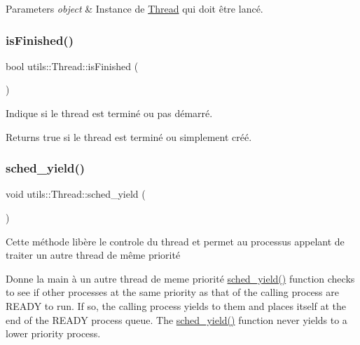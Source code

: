 \begin{DoxyParams}{Parameters}
{\em object} & Instance de \hyperlink{classutils_1_1Thread}{Thread} qui doit être lancé. \\
\hline
\end{DoxyParams}
\mbox{\label{classutils_1_1Thread_acc5214a88eab5c3bd421e7ee06f66b1a}} 
\subsubsection{\texorpdfstring{is\+Finished()}{isFinished()}}
{\footnotesize\ttfamily bool utils\+::\+Thread\+::is\+Finished (\begin{DoxyParamCaption}{ }\end{DoxyParamCaption})\hspace{0.3cm}{\ttfamily [inline]}}



Indique si le thread est terminé ou pas démarré. 

\begin{DoxyReturn}{Returns}
{\ttfamily true} si le thread est terminé ou simplement créé. 
\end{DoxyReturn}
\mbox{\label{classutils_1_1Thread_a540314edf56707d4f8732af3be6d7044}} 
\subsubsection{\texorpdfstring{sched\+\_\+yield()}{sched\_yield()}}
{\footnotesize\ttfamily void utils\+::\+Thread\+::sched\+\_\+yield (\begin{DoxyParamCaption}{ }\end{DoxyParamCaption})\hspace{0.3cm}{\ttfamily [protected]}}



Cette méthode libère le controle du thread et permet au processus appelant de traiter un autre thread de même priorité 

Donne la main à un autre thread de meme priorité  \hyperlink{classutils_1_1Thread_a540314edf56707d4f8732af3be6d7044}{sched\+\_\+yield()} function checks to see if other processes at the same priority as that of the calling process are R\+E\+A\+DY to run. If so, the calling process yields to them and places itself at the end of the R\+E\+A\+DY process queue. The \hyperlink{classutils_1_1Thread_a540314edf56707d4f8732af3be6d7044}{sched\+\_\+yield()} function never yields to a lower priority process. \mbox{\label{classutils_1_1Thread_a430ee2b8962147b587157fac97932219}} 
